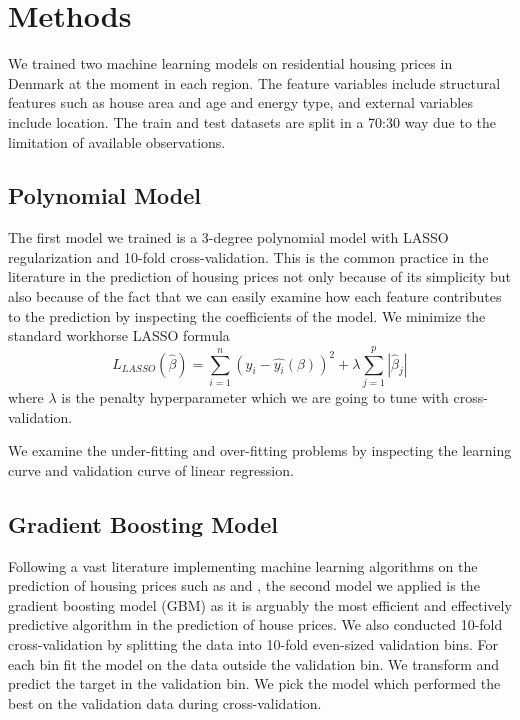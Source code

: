 \documentclass[12pt]{article} %
\begin{document}
{\section{Methods}
	   We trained two machine learning models on residential housing prices in Denmark at the moment in each region. The feature variables include structural features such as house area and age and energy type, and external variables include location. The train and test datasets are split in a 70:30 way due to the limitation of available observations.\par


    \subsection{Polynomial Model}
        The first model we trained is a 3-degree polynomial model with LASSO regularization and 10-fold cross-validation. This is the common practice in the literature in the prediction of housing prices not only because of its simplicity but also because of the fact that we can easily examine how each feature contributes to the prediction by inspecting the coefficients of the model. We minimize the standard workhorse LASSO formula
        \begin{equation}
            L_{LASSO}(\hat{\beta}) = \sum_{i=1}^n (y_i - \hat{y_i}(\beta))^2 + \lambda \sum_{j=1}^p |\hat{\beta}_j|
        \end{equation}
        where $\lambda$ is the penalty hyperparameter which we are going to tune with cross-validation.

		We examine the under-fitting and over-fitting problems by inspecting the learning curve and validation curve of linear regression.\par

    \subsection{Gradient Boosting Model}
        Following a vast literature implementing machine learning algorithms on the prediction of housing prices such as \cite{Linetal2023} and \cite{Deppneretal2023}, the second model we applied is the gradient boosting model (GBM) as it is arguably the most efficient and effectively predictive algorithm in the prediction of house prices. We also conducted 10-fold cross-validation by splitting the data into 10-fold even-sized validation bins. For each bin fit the model on the data outside the validation bin. We transform and predict the target in the validation bin. We pick the model which performed the best on the validation data during cross-validation.

}
\end{document}

